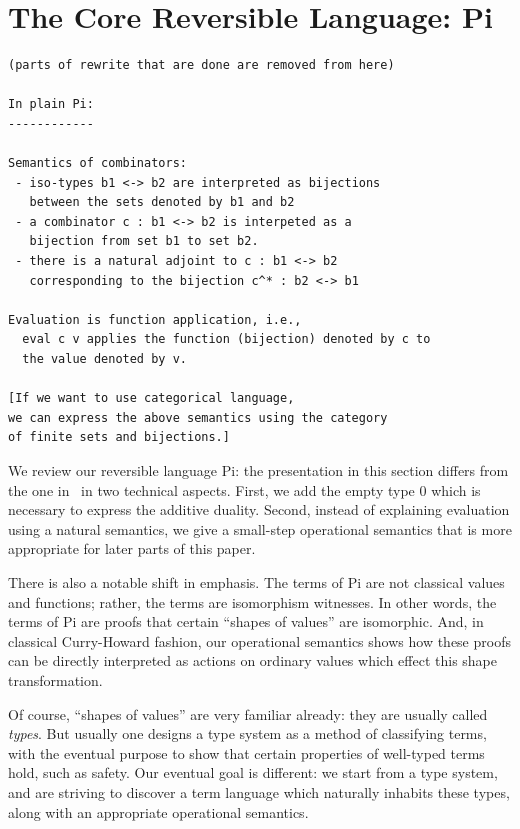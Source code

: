 \documentclass[preprint]{sigplanconf}
\begin{document}
\section{The Core Reversible Language: {{Pi}} }
\label{sec:pi}

\begin{verbatim}
(parts of rewrite that are done are removed from here)

In plain Pi: 
------------

Semantics of combinators:
 - iso-types b1 <-> b2 are interpreted as bijections 
   between the sets denoted by b1 and b2
 - a combinator c : b1 <-> b2 is interpeted as a 
   bijection from set b1 to set b2.
 - there is a natural adjoint to c : b1 <-> b2 
   corresponding to the bijection c^* : b2 <-> b1

Evaluation is function application, i.e., 
  eval c v applies the function (bijection) denoted by c to 
  the value denoted by v.

[If we want to use categorical language, 
we can express the above semantics using the category 
of finite sets and bijections.]
\end{verbatim} 

We review our reversible language {{Pi}}: the presentation in this
section differs from the one in~\cite{infeffects} in two technical
aspects. First, we add the empty type {{0}} which is necessary to express the
additive duality. Second, instead of explaining evaluation using a natural
semantics, we give a small-step operational semantics that is more
appropriate for later parts of this paper.

There is also a notable shift in emphasis.  The terms of {{Pi}} are not
classical values and functions; rather, the terms are isomorphism 
witnesses.  In other words, the terms of {{Pi}} are proofs that certain
``shapes of values'' are isomorphic.  And, in classical Curry-Howard
fashion, our operational semantics shows how these proofs can be
directly interpreted as actions on ordinary values which effect this
shape transformation.

Of course, ``shapes of values'' are very familiar already: they are usually
called \emph{types}.  But usually one designs a type system as a method
of classifying terms, with the eventual purpose to show that certain
properties of well-typed terms hold, such as safety.  Our eventual goal
is different: we start from a type system, and are striving to discover
a term language which naturally inhabits these types, along with an
appropriate operational semantics.
\end{document}
